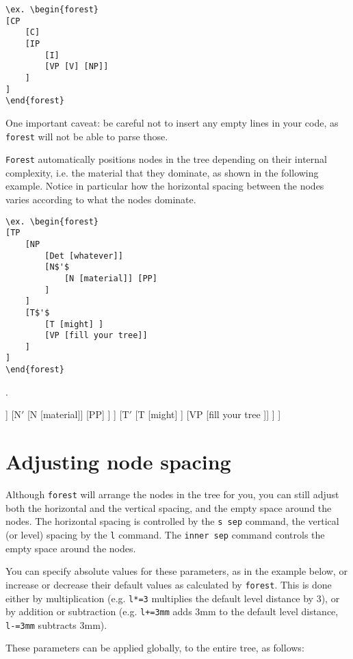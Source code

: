 \documentclass[english,12pt]{article}
\begin{document}
\begin{lstlisting}[basicstyle=\ttfamily,basewidth=0.5em]
\ex. \begin{forest}
[CP 
	[C] 
	[IP 
		[I]
		[VP [V] [NP]]
	] 
]
\end{forest}
\end{lstlisting}
One important caveat: be careful not to insert any empty lines in your code, as \texttt{forest} will not be able to parse those.

\texttt{Forest} automatically positions nodes in the tree depending on their internal complexity, i.e. the material that they dominate, as shown in the following example. Notice in particular how the horizontal spacing between the nodes varies according to what the nodes dominate.

\begin{lstlisting}[basicstyle=\ttfamily,basewidth=0.5em]
\ex. \begin{forest}
[TP
	[NP
		[Det [whatever]]
		[N$'$
			[N [material]] [PP]
		]
	] 
	[T$'$
		[T [might] ] 
		[VP [fill your tree]] 
	]
]
\end{forest}
\end{lstlisting}

\ex. \begin{forest}
[TP
	[NP
		[Det [whatever]]
		[N$'$
			[N [material]] [PP]
		]
	] 
	[T$'$
		[T [might] ] 
		[VP [fill your tree ]] 
	]
]
\end{forest}


\section{Adjusting node spacing}

Although \texttt{forest} will arrange the nodes in the tree for you, you can still adjust both the horizontal and the vertical spacing, and the empty space around the nodes. The horizontal spacing is controlled by the \texttt{s sep} command, the vertical (or level) spacing by the \texttt{l} command. The \texttt{inner sep} command controls the empty space around the nodes. 

You can specify absolute values for these parameters, as in the example below, or increase or decrease their default values as calculated by \texttt{forest}. This is done either by multiplication (e.g. \texttt{l*=3} multiplies the default level distance by 3), or by addition or subtraction (e.g. \texttt{l+=3mm} adds 3mm to the default level distance, \texttt{l-=3mm} subtracts 3mm). 

These parameters can be applied globally, to the entire tree, as follows:
\end{document}
